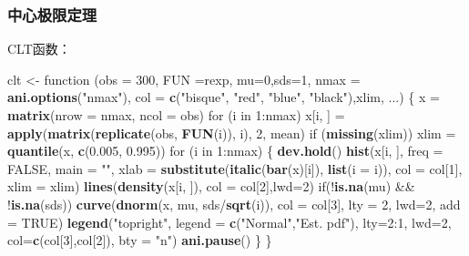 \documentclass[]{article}
\newenvironment{Shaded}{\begin{snugshade}}{\end{snugshade}}
\newcommand{\KeywordTok}[1]{\textcolor[rgb]{0.13,0.29,0.53}{\textbf{{#1}}}}
\newcommand{\DataTypeTok}[1]{\textcolor[rgb]{0.13,0.29,0.53}{{#1}}}
\newcommand{\DecValTok}[1]{\textcolor[rgb]{0.00,0.00,0.81}{{#1}}}
\newcommand{\FloatTok}[1]{\textcolor[rgb]{0.00,0.00,0.81}{{#1}}}
\newcommand{\StringTok}[1]{\textcolor[rgb]{0.31,0.60,0.02}{{#1}}}
\newcommand{\OtherTok}[1]{\textcolor[rgb]{0.56,0.35,0.01}{{#1}}}
\newcommand{\NormalTok}[1]{{#1}}
\begin{document}
\subsubsection{中心极限定理}

CLT函数：

\begin{Shaded}
\begin{Highlighting}[]
\NormalTok{clt <-}\StringTok{ }\NormalTok{function (}\DataTypeTok{obs =} \DecValTok{300}\NormalTok{, }\DataTypeTok{FUN =}\NormalTok{rexp, }\DataTypeTok{mu=}\DecValTok{0}\NormalTok{,}\DataTypeTok{sds=}\DecValTok{1}\NormalTok{,}
                 \DataTypeTok{nmax =} \KeywordTok{ani.options}\NormalTok{(}\StringTok{"nmax"}\NormalTok{),}
                 \DataTypeTok{col =} \KeywordTok{c}\NormalTok{(}\StringTok{"bisque"}\NormalTok{, }\StringTok{"red"}\NormalTok{, }\StringTok{"blue"}\NormalTok{, }\StringTok{"black"}\NormalTok{),xlim, ...) }
\NormalTok{\{}
    \NormalTok{x =}\StringTok{ }\KeywordTok{matrix}\NormalTok{(}\DataTypeTok{nrow =} \NormalTok{nmax, }\DataTypeTok{ncol =} \NormalTok{obs)}
    \NormalTok{for (i in }\DecValTok{1}\NormalTok{:nmax) x[i, ] =}\StringTok{ }\KeywordTok{apply}\NormalTok{(}\KeywordTok{matrix}\NormalTok{(}\KeywordTok{replicate}\NormalTok{(obs, }\KeywordTok{FUN}\NormalTok{(i)), i), }\DecValTok{2}\NormalTok{, mean)}
    \NormalTok{if (}\KeywordTok{missing}\NormalTok{(xlim)) xlim =}\StringTok{ }\KeywordTok{quantile}\NormalTok{(x, }\KeywordTok{c}\NormalTok{(}\FloatTok{0.005}\NormalTok{, }\FloatTok{0.995}\NormalTok{))}
    \NormalTok{for (i in }\DecValTok{1}\NormalTok{:nmax) \{}
        \KeywordTok{dev.hold}\NormalTok{()}
        \KeywordTok{hist}\NormalTok{(x[i, ], }\DataTypeTok{freq =} \OtherTok{FALSE}\NormalTok{, }\DataTypeTok{main =} \StringTok{""}\NormalTok{, }
             \DataTypeTok{xlab =} \KeywordTok{substitute}\NormalTok{(}\KeywordTok{italic}\NormalTok{(}\KeywordTok{bar}\NormalTok{(x)[i]), }\KeywordTok{list}\NormalTok{(}\DataTypeTok{i =} \NormalTok{i)), }
             \DataTypeTok{col =} \NormalTok{col[}\DecValTok{1}\NormalTok{], }\DataTypeTok{xlim =} \NormalTok{xlim)}
        \KeywordTok{lines}\NormalTok{(}\KeywordTok{density}\NormalTok{(x[i, ]), }\DataTypeTok{col =} \NormalTok{col[}\DecValTok{2}\NormalTok{],}\DataTypeTok{lwd=}\DecValTok{2}\NormalTok{)}
    \NormalTok{if(!}\KeywordTok{is.na}\NormalTok{(mu) &&}\StringTok{ }\NormalTok{!}\KeywordTok{is.na}\NormalTok{(sds))}
       \KeywordTok{curve}\NormalTok{(}\KeywordTok{dnorm}\NormalTok{(x, mu, sds/}\KeywordTok{sqrt}\NormalTok{(i)), }\DataTypeTok{col =} \NormalTok{col[}\DecValTok{3}\NormalTok{], }
             \DataTypeTok{lty =} \DecValTok{2}\NormalTok{, }\DataTypeTok{lwd=}\DecValTok{2}\NormalTok{, }\DataTypeTok{add =} \OtherTok{TRUE}\NormalTok{)}
    \KeywordTok{legend}\NormalTok{(}\StringTok{"topright"}\NormalTok{, }\DataTypeTok{legend =} \KeywordTok{c}\NormalTok{(}\StringTok{"Normal"}\NormalTok{,}\StringTok{"Est. pdf"}\NormalTok{),}
           \DataTypeTok{lty=}\DecValTok{2}\NormalTok{:}\DecValTok{1}\NormalTok{, }\DataTypeTok{lwd=}\DecValTok{2}\NormalTok{, }\DataTypeTok{col=}\KeywordTok{c}\NormalTok{(col[}\DecValTok{3}\NormalTok{],col[}\DecValTok{2}\NormalTok{]), }\DataTypeTok{bty =} \StringTok{"n"}\NormalTok{)}
    \KeywordTok{ani.pause}\NormalTok{()}
    \NormalTok{\}}
\NormalTok{\}}


\end{Highlighting}
\end{Shaded}
\end{document}
